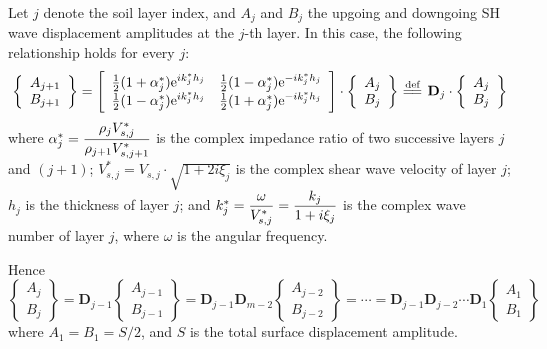 \documentclass[11pt,letterpaper]{article}
\begin{document}
Let $ j $ denote the soil layer index, and $ A_j $ and $ B_j $ the upgoing and downgoing SH wave displacement amplitudes at the $ j $-th layer.  In this case, the following relationship holds for every $ j $:
\begin{equation}
 \left\{\begin{array}{c}
A_{j+1} \\
B_{j+1}
\end{array} \right\} = \left[\begin{array}{cc}
\f{1}{2}(1+\alpha^*_j)\mrm{e}^{ik^*_jh_j} & \f{1}{2}(1-\alpha^*_j)\mrm{e}^{-ik^*_jh_j} \\
\f{1}{2}(1-\alpha^*_j)\mrm{e}^{ik^*_jh_j} & \f{1}{2}(1+\alpha^*_j)\mrm{e}^{-ik^*_jh_j}
\end{array} \right]\cdot \left\{\begin{array}{c}
A_j \\
B_j
\end{array} \right\}  \eqdef \mathbf{D}_j\cdot \left\{\begin{array}{c}
A_j \\
B_j
\end{array} \right\}
\end{equation}
where $ \alpha_j^* = \displaystyle\frac{\rho_j V^*_{s,j}}{\rho_{j+1} V^*_{s,j+1}}$ is the complex impedance ratio of two successive layers $ j $ and $ (j+1) $;  \newline $ V^*_{s,j} = V_{s,j}\cdot\sqrt{1+2i\xi_j}$ is the complex shear wave velocity of layer $ j $; $ h_j $ is the thickness of layer $ j $; and $ k^*_j = \displaystyle\frac{\omega}{V^*_{s,j}} = \frac{k_j}{1+i\xi_j}$ is the complex wave number of layer $ j $, where $ \omega $ is the angular frequency.

Hence
\begin{equation}
	\left\{\begin{array}{c}
A_j \\
B_j
\end{array} \right\} = \mathbf{D}_{j-1} \left\{\begin{array}{c}
A_{j-1} \\
B_{j-1}
\end{array} \right\} = \mathbf{D}_{j-1}\mathbf{D}_{m-2}\left\{\begin{array}{c}
A_{j-2} \\
B_{j-2}
\end{array} \right\} = \cdots = \mathbf{D}_{j-1}\mathbf{D}_{j-2}\cdots\mathbf{D}_{1}\left\{\begin{array}{c}
A_{1} \\
B_{1}
\end{array} \right\}
\label{eq:j_to_1}
\end{equation}
where $ A_1 = B_1 = S/2 $, and $ S $ is the total surface displacement amplitude.
\end{document}
